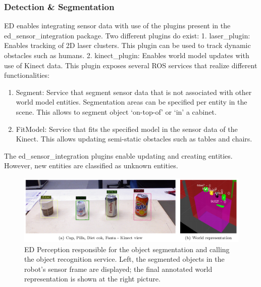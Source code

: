 \subsubsection{Detection \& Segmentation}
ED enables integrating sensor data with use of the plugins present in the ed\_sensor\_integration package. Two different plugins do exist:
1. laser\_plugin: Enables tracking of 2D laser clusters. This plugin can be used to track dynamic obstacles such as humans.
2. kinect\_plugin: Enables world model updates with use of Kinect data. This plugin exposes several ROS services that realize different functionalities:
\begin{enumerate}[label=(\alph*)]
\item Segment: Service that segment sensor data that is not associated with other world model entities. Segmentation areas can be specified per entity in the scene. This allows to segment object ‘on-top-of’ or ‘in’ a cabinet.
\item FitModel: Service that fits the specified model in the sensor data of the Kinect. This allows updating semi-static obstacles such as tables and chairs.
\end{enumerate}


The ed\_sensor\_integration plugins enable updating and creating entities. However, new entities are classified as unknown entities.
\begin{figure}[h]
    \centering
	\includegraphics[width = 1\linewidth]{Figures/ed_perception}
    \caption{ED Perception responsible for the object segmentation and calling the object recognition service. Left, the segmented objects in the robot's sensor frame are displayed; the final annotated world representation is shown at the right picture.}
	\label{fig:ed_perception}
\end{figure}